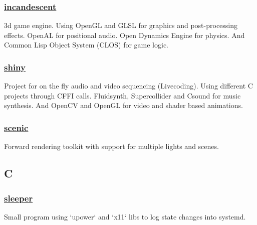 \documentclass[11pt]{article}
\begin{document}
\subsubsection{\href {https://github.com/azimut/incandescent} {incandescent}}
3d game engine. Using OpenGL and GLSL for graphics and post-processing effects. OpenAL for positional audio. Open Dynamics Engine for physics. And Common Lisp Object System (CLOS) for game logic.
\subsubsection{\href {https://github.com/azimut/shiny} {shiny}}
Project for on the fly audio and video sequencing (Livecoding). Using different C projects through CFFI calls. Fluidsynth, Supercollider and Csound for music synthesis. And OpenCV and OpenGL for video and shader based animations.
\subsubsection{\href {https://github.com/azimut/scenic} {scenic}}
Forward rendering toolkit with support for multiple lights and scenes.

\subsection{C}
\subsubsection{\href {https://github.com/azimut/sleeper} {sleeper}}
Small program using `upower` and `x11` libs to log state changes into systemd.
\end{document}

